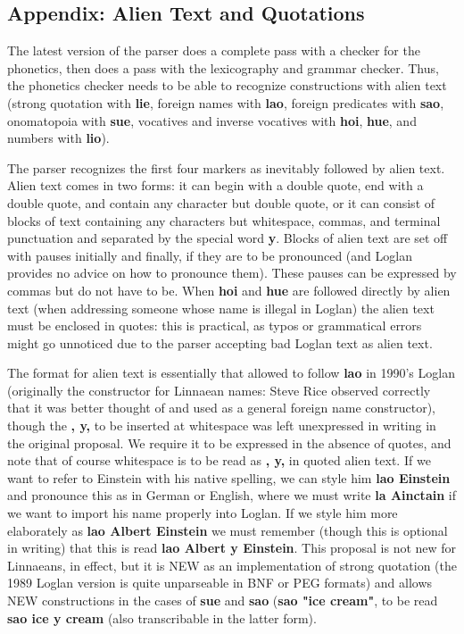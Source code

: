 \documentclass[12pt]{book}
\begin{document}
\subsection{Appendix:  Alien Text and Quotations}

The latest version of the parser does a complete pass with a checker for the phonetics, then does a pass with the lexicography and grammar checker.
Thus, the phonetics checker needs to be able to recognize constructions with alien text (strong quotation with {\bf lie}, foreign names with {\bf lao}, foreign predicates with {\bf sao}, onomatopoia with {\bf sue}, vocatives and inverse vocatives with {\bf hoi}, {\bf hue}, and numbers with {\bf lio}).

The parser recognizes the first four markers as inevitably followed by alien text.  Alien text comes in two forms:  it can begin with a double quote,
end with a double quote, and contain any character but double quote, or it can consist of blocks of text containing any characters but whitespace, commas, and terminal punctuation and separated by the special word {\bf y}.  Blocks of alien text are set off with pauses initially and finally, if they are to be pronounced (and Loglan provides no advice on how to pronounce them).  These pauses can be expressed by commas but do not have to be.  When {\bf hoi} and
{\bf hue} are followed directly by alien text (when addressing someone whose name is illegal in Loglan) the alien text must be enclosed in quotes:  this is practical, as typos or grammatical errors might go unnoticed due to the parser accepting bad Loglan text as alien text.

The format for alien text is essentially that allowed to follow {\bf lao} in 1990's Loglan (originally the constructor for Linnaean names:  Steve Rice observed correctly that it was better thought of and used as a general foreign name constructor), though the {\bf, y,} to be inserted at whitespace was left unexpressed in writing in the original proposal.   We require it to be expressed in the absence of quotes, and note that of course whitespace is to be read as {\bf, y,} in quoted alien text. If we want to refer to Einstein with his native spelling, we can style him {\bf lao Einstein} and pronounce this as in German or English, where we must write {\bf la Ainctain} if we want to import his name properly into Loglan.  If we style him more elaborately as {\bf lao Albert Einstein} we must remember (though this is optional in writing) that this is read {\bf lao Albert y Einstein}.
This proposal is not new for Linnaeans, in effect, but it is NEW as an implementation of strong quotation (the 1989 Loglan version is quite unparseable in BNF or PEG formats) and allows NEW constructions in the cases of {\bf sue} and {\bf sao} ({\bf sao "ice cream"}, to be read {\bf sao ice y cream} (also transcribable in the latter form).
\end{document}
